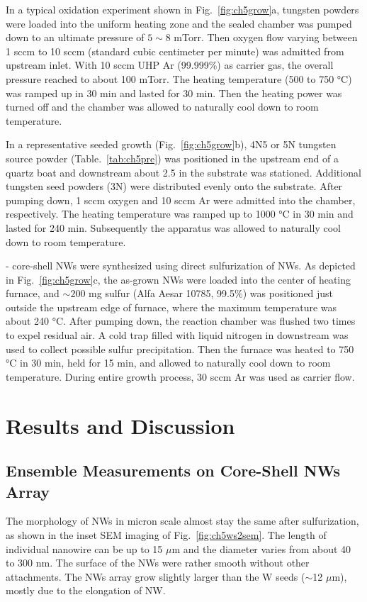 In a typical oxidation experiment shown in Fig.~\ref{fig:ch5grow}a, tungsten powders were loaded into the uniform heating zone and the sealed chamber was pumped down to an ultimate pressure of $5\sim8$ mTorr. Then oxygen flow varying between 1 sccm to 10 sccm (standard cubic centimeter per minute) was admitted from upstream inlet. With 10 sccm UHP Ar (99.999\%) as carrier gas, the overall pressure reached to about 100 mTorr. The heating temperature (500 to 750 \si{\degreeCelsius}) was ramped up in 30 min and lasted for 30 min. Then the heating power was turned off and the chamber was allowed to naturally cool down to room temperature.

In a representative seeded growth (Fig.~\ref{fig:ch5grow}b), 4N5 or 5N tungsten source powder (Table.~\ref{tab:ch5pre}) was positioned in the upstream end of a quartz boat and downstream about 2.5 in the substrate was stationed. Additional tungsten seed powders (3N) were distributed evenly onto the substrate. After pumping down, 1 sccm oxygen and 10 sccm Ar were admitted into the chamber, respectively. The heating temperature was ramped up to 1000 \si{\degreeCelsius} in 30 min and lasted for 240 min. Subsequently the apparatus was allowed to naturally cool down to room temperature. 

- core-shell NWs were synthesized using direct sulfurization of  NWs. As depicted in Fig.~\ref{fig:ch5grow}c, the as-grown  NWs were loaded into the center of heating furnace, and $\sim200$ mg sulfur (Alfa Aesar 10785, 99.5\%) was positioned just outside the upstream edge of furnace, where the maximum temperature was about 240 \si{\degreeCelsius}. After pumping down, the reaction chamber was flushed two times to expel residual air. A cold trap filled with liquid nitrogen in downstream was used to collect possible sulfur precipitation. Then the furnace was heated to 750 \si{\degreeCelsius} in 30 min, held for 15 min, and allowed to naturally cool down to room temperature. During entire growth process, 30 sccm Ar was used as carrier flow.

\section{Results and Discussion}
\subsection{Ensemble Measurements on Core-Shell NWs Array}

The morphology of  NWs in micron scale almost stay the same after sulfurization, as shown in the inset SEM imaging of Fig.~\ref{fig:ch5ws2sem}. The length of individual nanowire can be up to 15 $\mu$m and the diameter varies from about 40 to 300 nm. The surface of the NWs were rather smooth without other attachments. The NWs array grow slightly larger than the W seeds ($\sim$12 $\mu$m), mostly due to the elongation of NW. 

